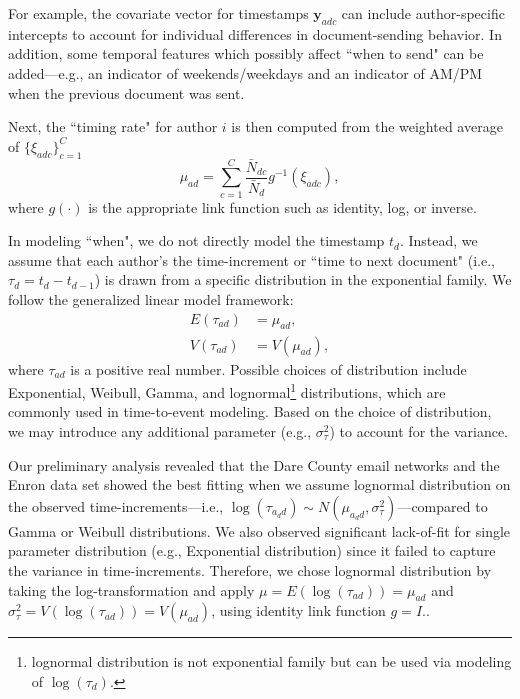 \documentclass{article}
\begin{document}
For example, the covariate vector for timestamps $\boldsymbol{y}_{adc}$ can include author-specific intercepts to account for individual differences in document-sending behavior. In addition, some temporal features which possibly affect ``when to send" can be added---e.g., an indicator of weekends/weekdays and an indicator of AM/PM when the previous document was sent. 

Next, the ``timing rate" for author $i$ is then computed from the weighted average of $\{\xi_{adc}\}_{c=1}^C$ 
\begin{equation}
\mu_{ad} = \sum_{c=1}^C \frac{\bar N_{dc}}{\bar N_d} g^{-1}(\xi_{adc}),
\end{equation}
where $g(\cdot)$ is the appropriate link function such as identity, log, or inverse. 

In modeling ``when", we do not directly model the timestamp $t_d$. Instead, we assume that each author's the time-increment or ``time to next document" (i.e., $\tau_{d} = t_d-t_{d-1}$) is drawn from a specific distribution in the exponential family.  We follow the generalized linear model framework:
\begin{equation}
\begin{aligned}
E(\tau_{ad}) &= \mu_{ad},\\
V(\tau_{ad}) &= V(\mu_{ad}),
\end{aligned}
\end{equation}
where $\tau_{ad}$ is a positive real number. Possible choices of distribution include Exponential, Weibull, Gamma, and lognormal\footnote{lognormal distribution is not exponential family but can be used via modeling of $\log(\tau_d)$.} distributions, which are commonly used in time-to-event modeling. Based on the choice of distribution, we may introduce any additional parameter (e.g., $\sigma_\tau^2$) to account for the variance.

Our preliminary analysis revealed that the Dare County email networks and the Enron data set showed the best fitting when we assume lognormal distribution on the observed time-increments---i.e., $\log(\tau_{a_dd}) \sim N(\mu_{a_d d}, \sigma^2_\tau)$---compared to Gamma or Weibull distributions. We also observed significant lack-of-fit for single parameter distribution (e.g., Exponential distribution) since it failed to capture the variance in time-increments. Therefore, we chose lognormal distribution by taking the log-transformation and apply $\mu = E(\log(\tau_{ad})) = \mu_{ad}$ and $ \sigma_\tau^2=V(\log(\tau_{ad})) = V(\mu_{ad})$, using identity link function $g = I$.. 
\end{document}
